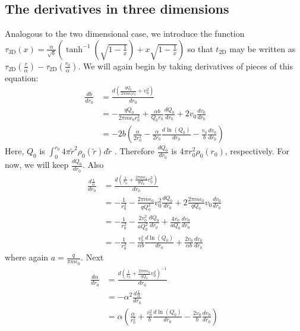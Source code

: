 \documentclass[aps,prl,twocolumn,showpacs,superscriptaddress,groupedaddress]{revtex4-1}  %
\begin{document}
\subsection{The derivatives in three dimensions}
Analogous to the two dimensional case, we introduce the function 
$\tau_\text{3D}(x) = \frac{\alpha}{\sqrt{b}} \left( \tanh^{-1} \left( \sqrt{1 -  \frac{1}{x}} \right) + x\sqrt{1 -  \frac{1}{x}} \right)$ so
that $t_\text{2D}$ may be written as $\tau_\text{2D}(\frac{r}{\alpha}) - \tau_\text{2D}(\frac{r_0}{\alpha})$.
We will
again begin by taking derivatives of pieces of this equation:
\begin{align}
  \frac{d b}{d r_0} &= \frac{d \left(\frac{q Q_0}{2 \pi m \epsilon_0 r_0} + v_0^2\right)}{d r_0} \nonumber\\
                                                  &= -\frac{q Q_0}{2 \pi m \epsilon_0 r_0^2} + \frac{\alpha b}{Q_0 r_0} \frac{d Q_0}{d r_0} + 2 v_0 \frac{d v_0}{dr_0}\nonumber\\
                                                  &= - 2 b\left(\frac{\alpha}{2 r_0^2} - \frac{\alpha}{2 r_0} \frac{d \ln(Q_0)}{d r_0} - \frac{v_0}{b}  \frac{d v_0}{dr_0}\right) \label{eq:derivative b}
\end{align}
Here, $Q_0$ is $\int_0^{r_0} 4\pi \tilde{r}^2 \rho_0(\tilde{r}) d\tilde{r}$ .  Therefore $\frac{d Q_0}{d r_0}$ is $4\pi r_0^2 \rho_0(r_0) $, respectively.  For now, we will keep
$\frac{d Q_0}{d r_0}$.  Also
\begin{align}
  \frac{d \frac{1}{\alpha}}{d r_0} &= \frac{d \left(\frac{1}{r_0} +\frac{2 \pi m \epsilon_0}{q Q_0} v_0^2\right)}{d r_0}  \nonumber\\
                                                  &= -\frac{1}{r_0^2} - \frac{2 \pi m \epsilon_0}{q Q_0^2} v_0^2 \frac{d Q_0}{d r_0} + 2 \frac{2 \pi m \epsilon_0}{q Q_0} v_0 \frac{d v_0}{dr_0}\nonumber\\
                                                  &= -\frac{1}{r_0^2} - \frac{2 v_0^2}{a Q_0^2} \frac{d Q_0}{d r_0} + \frac{4 v_0}{a Q_0} \frac{d v_0}{d r_0} \nonumber\\
                                                  &= -\frac{1}{r_0^2} - \frac{v_0^2}{\alpha b} \frac{d \ln(Q_0)}{d r_0} +  \frac{2 v_0}{\alpha b} \frac{d v_0}{d r_0}\label{eq:derivative 1 over alpha}
\end{align}
where again $a = \frac{q}{\pi m \epsilon_0}$.  Next
\begin{align}
  \frac{d \alpha}{d r_0} &= \frac{d \left(\frac{1}{r_0} +\frac{2 \pi m \epsilon_0}{q Q_0} v_0^2\right)^{-1}}{d r_0} \nonumber\\
                                    &= -\alpha^2\frac{d \frac{1}{\alpha}}{d r_0}\nonumber\\
                                    &=  \alpha \left( \frac{\alpha}{r_0^2} + \frac{v_0^2}{b} \frac{d \ln(Q_0)}{d r_0} - \frac{2 v_0}{b} \frac{d v_0}{d r_0}\right)\label{eq:derivative 1 over alpha}
\end{align}
\end{document}

